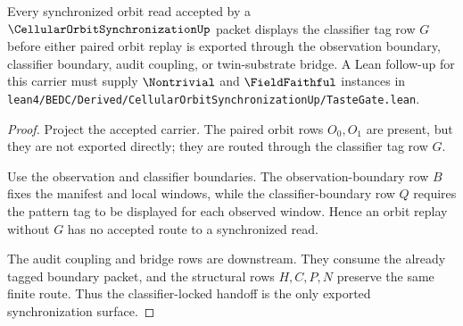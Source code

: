 \begin{theorem}
\label{thm:cellular-orbit-synchronization-classifier-locked-handoff}
Every synchronized orbit read accepted by a $\CellularOrbitSynchronizationUp$ packet displays the classifier tag row $G$ before either paired orbit replay is exported through the observation boundary, classifier boundary, audit coupling, or twin-substrate bridge. A Lean follow-up for this carrier must supply $\Nontrivial$ and $\FieldFaithful$ instances in \texttt{lean4/BEDC/Derived/CellularOrbitSynchronizationUp/TasteGate.lean}.
\end{theorem}
\begin{proof}
Project the accepted carrier. The paired orbit rows $O_0,O_1$ are present, but they are not exported directly; they are routed through the classifier tag row $G$.

Use the observation and classifier boundaries. The observation-boundary row $B$ fixes the manifest and local windows, while the classifier-boundary row $Q$ requires the pattern tag to be displayed for each observed window. Hence an orbit replay without $G$ has no accepted route to a synchronized read.

The audit coupling and bridge rows are downstream. They consume the already tagged boundary packet, and the structural rows $H,C,P,N$ preserve the same finite route. Thus the classifier-locked handoff is the only exported synchronization surface.
\end{proof}




